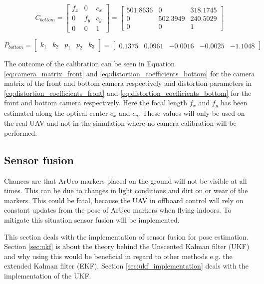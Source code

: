 \documentclass[../Head/report.tex]{subfiles}
\begin{document}
\begin{equation}
C_{bottom}  = 
\begin{bmatrix}
f_x & 0 & c_x\\
0 & f_y & c_y\\
0 & 0 & 1
\end{bmatrix}
=
\begin{bmatrix}
501.8636 & 0 & 318.1745\\
0 & 502.3949 & 240.5029\\
0 & 0 & 1
\end{bmatrix}
\label{eq:camera_matrix_bottom}
\end{equation}

\begin{equation}
P_{bottom} =
\begin{bmatrix}
k_1 & k_2 & p_1 & p_2 & k_3
\end{bmatrix}
=
\begin{bmatrix}
0.1375 & 0.0961 & -0.0016 & -0.0025 & -1.1048
\end{bmatrix}
\label{eq:distortion_coefficients_bottom}
\end{equation}

The outcome of the calibration can be seen in Equation \ref{eq:camera_matrix_front} and \ref{eq:distortion_coefficients_bottom} for the camera matrix of the front and bottom camera respectively and distortion parameters in \ref{eq:distortion_coefficients_front} and \ref{eq:distortion_coefficients_bottom} for the front and bottom camera respectively. Here the focal length $f_x$ and $f_y$ has been estimated along the optical center $c_x$ and $c_y$. These values will only be used on the real UAV and not in the simulation where no camera calibration will be performed.

\subsection{Sensor fusion}
\label{sec:sensor_fusion}
Chances are that ArUco markers placed on the ground will not be visible at all times. This can be due to changes in light conditions and dirt on or wear of the markers. This could be fatal, because the UAV in offboard control will rely on constant updates from the pose of ArUco markers when flying indoors. To mitigate this situation sensor fusion will be implemented. 

This section deals with the implementation of sensor fusion for pose estimation. Section \ref{sec:ukf} is about the theory behind the Unscented Kalman filter (UKF) and why using this would be beneficial in regard to other methods e.g. the extended Kalman filter (EKF). Section \ref{sec:ukf_implementation} deals with the implementation of the UKF.   
\end{document}
